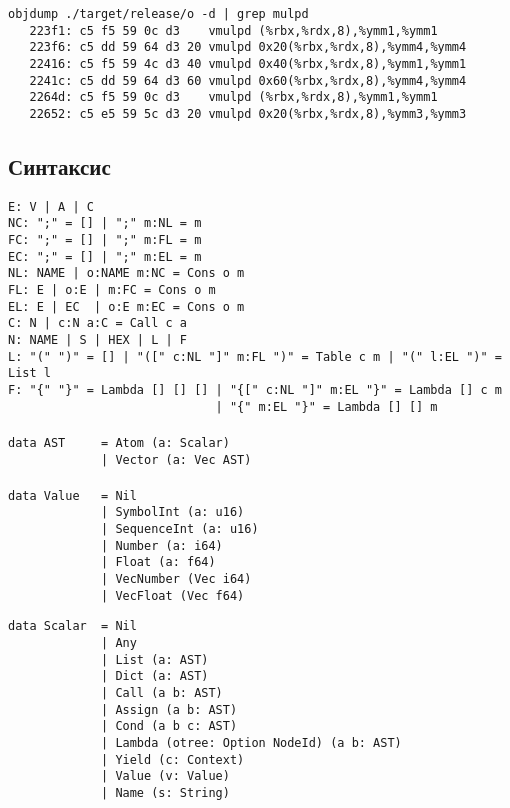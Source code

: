 \begin{lstlisting}
objdump ./target/release/o -d | grep mulpd
   223f1: c5 f5 59 0c d3    vmulpd (%rbx,%rdx,8),%ymm1,%ymm1
   223f6: c5 dd 59 64 d3 20 vmulpd 0x20(%rbx,%rdx,8),%ymm4,%ymm4
   22416: c5 f5 59 4c d3 40 vmulpd 0x40(%rbx,%rdx,8),%ymm1,%ymm1
   2241c: c5 dd 59 64 d3 60 vmulpd 0x60(%rbx,%rdx,8),%ymm4,%ymm4
   2264d: c5 f5 59 0c d3    vmulpd (%rbx,%rdx,8),%ymm1,%ymm1
   22652: c5 e5 59 5c d3 20 vmulpd 0x20(%rbx,%rdx,8),%ymm3,%ymm3
\end{lstlisting}

\newpage
\subsection{Синтаксис}

\begin{lstlisting}[mathescape=true]
E: V | A | C
NC: ";" = [] | ";" m:NL = m
FC: ";" = [] | ";" m:FL = m
EC: ";" = [] | ";" m:EL = m
NL: NAME | o:NAME m:NC = Cons o m
FL: E | o:E | m:FC = Cons o m
EL: E | EC  | o:E m:EC = Cons o m
C: N | c:N a:C = Call c a
N: NAME | S | HEX | L | F
L: "(" ")" = [] | "([" c:NL "]" m:FL ")" = Table c m | "(" l:EL ")" = List l
F: "{" "}" = Lambda [] [] [] | "{[" c:NL "]" m:EL "}" = Lambda [] c m
                             | "{" m:EL "}" = Lambda [] [] m
\end{lstlisting}

\paragraph{}
\begin{lstlisting}
data AST     = Atom (a: Scalar)
             | Vector (a: Vec AST)
\end{lstlisting}

\paragraph{}
\begin{lstlisting}
data Value   = Nil
             | SymbolInt (a: u16)
             | SequenceInt (a: u16)
             | Number (a: i64)
             | Float (a: f64)
             | VecNumber (Vec i64)
             | VecFloat (Vec f64)
\end{lstlisting}

\begin{lstlisting}
data Scalar  = Nil
             | Any
             | List (a: AST)
             | Dict (a: AST)
             | Call (a b: AST)
             | Assign (a b: AST)
             | Cond (a b c: AST)
             | Lambda (otree: Option NodeId) (a b: AST)
             | Yield (c: Context)
             | Value (v: Value)
             | Name (s: String)
\end{lstlisting}



